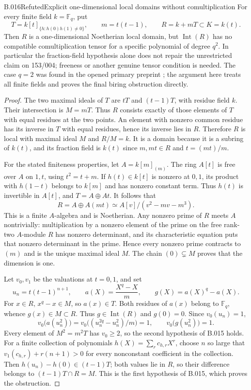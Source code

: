 \begin{saresult}{B.016}{Refuted}{Explicit one-dimensional local domains without comultiplication}
For every finite field $k=\mathbb F_q$, put
\[
 T=k[t]_{\{h:h(0)h(1)\ne0\}},\qquad m=t(t-1),\qquad
 R=k+mT\subset K=k(t).
\]
Then $R$ is a one-dimensional Noetherian local domain, but
$\operatorname{Int}(R)$ has no compatible comultiplication tensor
for a specific polynomial of degree $q^2$. In particular the
fraction-field hypothesis alone does not repair the unrestricted
claim on 153/004; freeness or another genuine tensor condition is
needed. The case $q=2$ was found in the opened primary preprint
\cite[Theorem 3.4, pp.7--8]{JiangEtAl2026}; the argument here treats
all finite fields and proves the final biring obstruction directly.
\end{saresult}
\begin{proof}
The two maximal ideals of $T$ are $tT$ and $(t-1)T$, with residue
field $k$. Their intersection is $M=mT$. Thus $R$ consists exactly
of those elements of $T$ with equal residues at the two points.
An element with nonzero common residue has its inverse in $T$ with
equal residues, hence its inverse lies in $R$. Therefore $R$ is
local with maximal ideal $M$ and $R/M=k$. It is a domain because
it is a subring of $k(t)$, and its fraction field is $k(t)$ since
$m,mt\in R$ and $t=(mt)/m$.

For the stated finiteness properties, let $A=k[m]_{(m)}$. The ring
$A[t]$ is free over $A$ on $1,t$, using $t^2=t+m$. If
$h(t)\in k[t]$ is nonzero at $0,1$, its product with $h(1-t)$
belongs to $k[m]$ and has nonzero constant term. Thus $h(t)$ is
invertible in $A[t]$, and $T=A\oplus At$. It follows that
\[
 R=A\oplus A(mt)\simeq
 A[v]/(v^2-mv-m^3).
\]
This is a finite $A$-algebra and is Noetherian. Any nonzero prime
of $R$ meets $A$ nontrivially: multiplication by a nonzero element
of the prime on the free rank-two $A$-module $R$ has nonzero
determinant, and its characteristic equation puts that nonzero
determinant in the prime. Hence every nonzero prime contracts to
$(m)$ and is the unique maximal ideal $M$. The chain
$(0)\subsetneq M$ proves that the dimension is one.

Let $v_0,v_1$ be the valuations at $t=0,1$, and set
\[
 u_n=t(t-1)^{n+1},\qquad
 a(X)=\frac{X^q-X}{m},\qquad g(X)=a(X)^q-a(X).
\]
For $x\in R$, $x^q-x\in M$, so $a(x)\in T$. Both residues of
$a(x)$ belong to $\mathbb F_q$, whence $g(x)\in M\subset R$.
Thus $g\in\operatorname{Int}(R)$ and $g(0)=0$. Since
$v_0(u_n)=1$,
\[
 v_0\bigl(a(u_n^2)\bigr)
 =v_0\bigl((u_n^{2q}-u_n^2)/m\bigr)=1,
 \qquad v_0\bigl(g(u_n^2)\bigr)=1.
\]
Every element of $M^2=m^2T$ has $v_0\ge2$, so the second hypothesis
of B.015 holds. For a finite collection of polynomials
$h(X)=\sum_r c_{h,r}X^r$, choose $n$ so large that
$v_1(c_{h,r})+r(n+1)>0$ for every nonconstant coefficient in the
collection. Then $h(u_n)-h(0)\in(t-1)T$; both values lie in $R$,
so their difference belongs to $(t-1)T\cap R=M$. This is the first
hypothesis of B.015, which proves the obstruction.


\end{proof}
